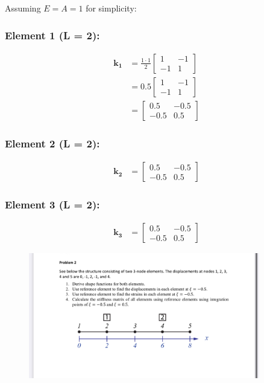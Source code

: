\documentclass[12pt,a4paper]{article}
\begin{document}
Assuming $E = A = 1$ for simplicity:

\subsubsection*{Element 1 (L = 2):}
\begin{align}
\mathbf{k_1} &= \frac{1 \cdot 1}{2} \begin{bmatrix} 1 & -1 \\ -1 & 1 \end{bmatrix} \\
&= 0.5 \begin{bmatrix} 1 & -1 \\ -1 & 1 \end{bmatrix} \\
&= \begin{bmatrix} 0.5 & -0.5 \\ -0.5 & 0.5 \end{bmatrix}
\end{align}

\subsubsection*{Element 2 (L = 2):}
\begin{align}
\mathbf{k_2} &= \begin{bmatrix} 0.5 & -0.5 \\ -0.5 & 0.5 \end{bmatrix}
\end{align}

\subsubsection*{Element 3 (L = 2):}
\begin{align}
\mathbf{k_3} &= \begin{bmatrix} 0.5 & -0.5 \\ -0.5 & 0.5 \end{bmatrix}
\end{align}

\clearpage
\begin{figure}[H]
\centering
\includegraphics[width=0.9\textwidth]{IMG_5526.jpeg}
\end{figure}
\end{document}
